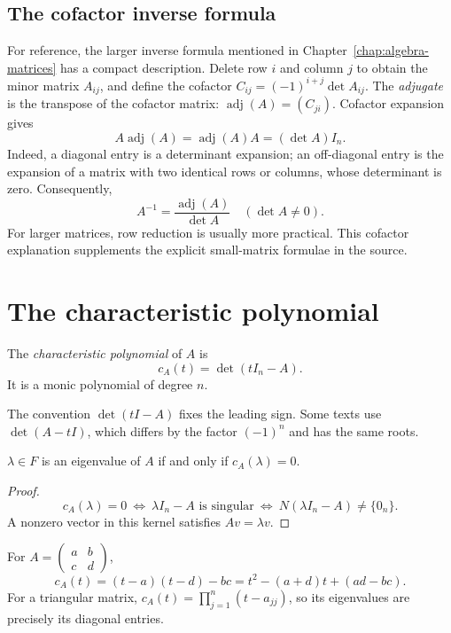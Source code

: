 \subsection{The cofactor inverse formula}

For reference, the larger inverse formula mentioned in
Chapter~\ref{chap:algebra-matrices} has a compact description.
Delete row $i$ and column $j$ to obtain the minor matrix $A_{ij}$, and
define the cofactor $C_{ij}=(-1)^{i+j}\det A_{ij}$.
The \emph{adjugate} is the transpose of the cofactor matrix:
$\operatorname{adj}(A)=(C_{ji})$.
Cofactor expansion gives
\[
 A\operatorname{adj}(A)=\operatorname{adj}(A)A=(\det A)I_n.
\]
Indeed, a diagonal entry is a determinant expansion; an off-diagonal
entry is the expansion of a matrix with two identical rows or columns,
whose determinant is zero.
Consequently,
\[
 \boxed{A^{-1}=\frac{\operatorname{adj}(A)}{\det A}\quad(\det A\ne0).}
\]
For larger matrices, row reduction is usually more practical.
This cofactor explanation supplements the explicit small-matrix formulae
in the source.

\section{The characteristic polynomial}

\begin{definition}
The \emph{characteristic polynomial} of $A$ is
\[
 c_A(t)=\det(tI_n-A).
\]
It is a monic polynomial of degree $n$.
\end{definition}

The convention $\det(tI-A)$ fixes the leading sign.
Some texts use $\det(A-tI)$, which differs by the factor $(-1)^n$
and has the same roots.

\begin{theorem}
$\lambda\in F$ is an eigenvalue of $A$ if and only if $c_A(\lambda)=0$.
\end{theorem}
\begin{proof}
\[
 c_A(\lambda)=0
 \ \Longleftrightarrow\ \lambda I_n-A\text{ is singular}
 \ \Longleftrightarrow\ N(\lambda I_n-A)\ne\{0_n\}.
\]
A nonzero vector in this kernel satisfies $Av=\lambda v$.
\end{proof}

For $A=\begin{pmatrix}a&b\\c&d\end{pmatrix}$,
\[
 c_A(t)=(t-a)(t-d)-bc=t^2-(a+d)t+(ad-bc).
\]
For a triangular matrix,
$c_A(t)=\prod_{j=1}^n(t-a_{jj})$, so its eigenvalues are precisely its
diagonal entries.

